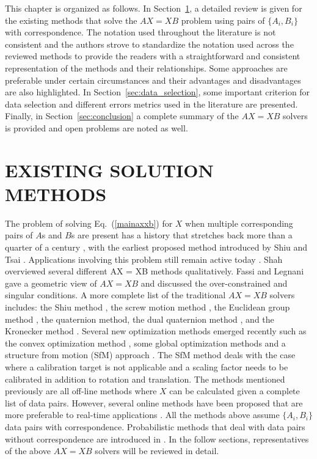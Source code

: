 \documentclass[twocolumn,10pt]{asme2ej}
\begin{document}
This chapter is organized as follows. 
In Section~\ref{sec:sol_methods}, a detailed review is given for the existing methods that solve the $AX=XB$ problem using pairs of $\{A_{i}, B_{i}\}$ with correspondence. The notation used throughout the literature is not consistent and the authors strove %
to standardize the notation used across the reviewed methods to provide the readers with a straightforward and consistent representation of the methods and their relationships.
Some approaches are preferable under certain circumstances and their advantages and disadvantages are also highlighted. 
In Section~\ref{sec:data_selection}, some important criterion for data selection and different errors metrics used in the literature are presented. 
Finally, in Section~\ref{sec:conclusion} a complete summary of the $AX=XB$ solvers is provided and open problems are noted as well.    

\section{EXISTING SOLUTION METHODS}
\label{sec:sol_methods}
 
The problem of solving Eq.~(\ref{mainaxxb}) for $X$ when multiple corresponding pairs of $A$s and $B$s are present has a history that stretches back more than a quarter of a century
\cite{chou1991finding, park1994robot,shiu1989calibration}, with the earliest proposed method introduced by Shiu \cite{shiu1987finding, shiu1989calibration} and Tsai \cite{tsai1989new}. Applications involving this problem still remain active today \cite{kim,dai}. Shah \cite{shah2012overview} overviewed several different AX = XB methods qualitatively. Fassi and Legnani \cite{fassi2005hand} gave a geometric view of $AX=XB$ and discussed the over-constrained and singular conditions. A more complete list of the traditional $AX=XB$ solvers includes: the Shiu method \cite{shiu1989calibration}, the screw motion method \cite{chen91,zhao2006hand}, the Euclidean group method \cite{park1994robot,gwak2003numerical}, the quaternion method\cite{chou1988quaternions, chou1991finding, horaud1995hand}, the dual quaternion method \cite{daniilidis1996dual, daniilidis1999hand}, and the Kronecker method \cite{andreff1999line,andreff2001robot}. Several new optimization methods emerged recently such as the convex optimization method \cite{zhao2011hand}, some global optimization methods  \cite{seo2009branch,andreff2001robot,heller2014hand} and a structure from motion (SfM) approach \cite{schmidt2005calibration}. The SfM method deals with the case where a calibration target is not applicable and a scaling factor needs to be calibrated in addition to rotation and translation. The methods mentioned previously are all off-line methods where $X$ can be calculated given a complete list of data pairs. However, several online methods have been 
proposed that are more preferable to real-time applications \cite{andreff1999line,angeles2000online,ackerman2014online}. All the methods above assume $\{A_i, B_i\}$ data pairs with correspondence. Probabilistic methods that deal with data pairs without correspondence are introduced in \cite{ackermanGSI, ackerman2014information}. In the follow sections, representatives of the above $AX=XB$ solvers will be reviewed in detail.
\end{document}
